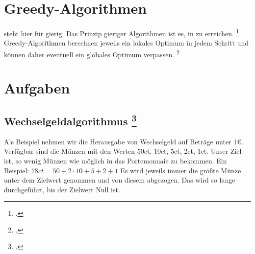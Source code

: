 \documentclass{lehramt-informatik-haupt}
\begin{document}

\chapter{Greedy-Algorithmen}

\begin{quellen}
\item \cite[Seite 207-235 (PDF 225-253)]{saake}
\item \cite[Seite 5-6]{aud:fs:3}
\item \cite{wiki:greedy-algorithmus}
\end{quellen}

 steht hier für gierig. Das Prinzip gieriger Algorithmen
ist es, in  zu erreichen.
\footcite[Seite 213 (PDF 231)]{saake}
Greedy-Algorithmen berechnen jeweils ein lokales Optimum in jedem Schritt
und können daher eventuell ein globales Optimum verpassen.
\footcite[Seite 214 (PDF 232)]{saake}


\chapter{Aufgaben}

%

\section{Wechselgeldalgorithmus
\footcite{net:html:wikiversity:wechselgeld}}

Als Beispiel nehmen wir die Herausgabe von Wechselgeld auf Beträge unter
1€. Verfügbar sind die Münzen mit den Werten 50ct, 10ct, 5ct, 2ct, 1ct.
Unser Ziel ist, so wenig Münzen wie möglich in das Portemonnaie zu
bekommen.
%
Ein Beispiel: $78ct = 50 + 2 \cdot 10 + 5 + 2 + 1$
%
Es wird jeweils immer die größte Münze unter dem Zielwert genommen und
von diesem abgezogen. Das wird so lange durchgeführt, bis der Zielwert
Null ist.

%
\end{document}
